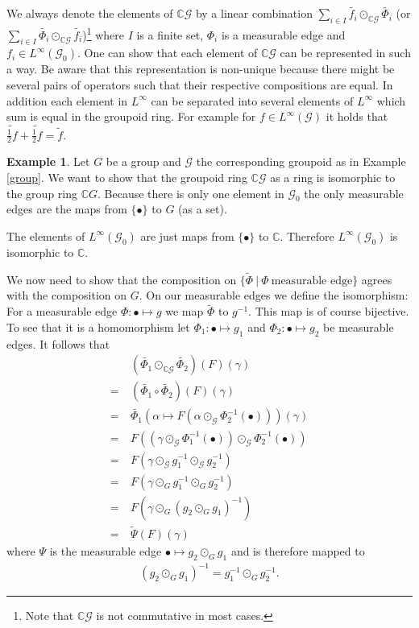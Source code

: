 \documentclass[12pt,a4paper]{scrartcl}
\theoremstyle{plain}
\theoremstyle{definition}
\newtheorem{Example}[Theorem]{Example}
\newcommand{\C}{\mathbb{C}} %
\newcommand{\2}{\mathbb{Z} / 2 \mathbb{Z}}
\newcommand{\G}{\mathcal{G}}
\newcommand{\1}{\bar{1}}
\newcommand{\0}{\bar{0}}
\begin{document}
We always denote the elements of $\C\G$ by a linear combination $\sum_{i \in I} \widetilde{f_i} \odot_{\C \G} \widetilde{\Phi_i}$ (or $\sum_{i \in I} \widetilde{\Phi_i} \odot_{\C \G} \widetilde{f_i}$)\footnote{Note that $\C\G$ is not commutative in most cases.} where $I$ is a finite set, $\Phi_i$ is a measurable edge and $f_i \in L^\infty(\G_0)$. One can show that each element of $\C \G$ can be represented in such a way. Be aware that this representation is non-unique because there might be several pairs of operators such that their respective compositions are equal. In addition each element in $L^\infty$ can be separated into several elements of $L^\infty$ which sum is equal in the groupoid ring. For example for $f \in L^\infty(\G)$ it holds that $\widetilde{\frac{1}{2}f} + \widetilde{\frac{1}{2}f} = \tilde{f}$.
\begin{Example} \label{groupoid_ring_of_groups}
	Let $G$ be a group and $\G$ the corresponding groupoid as in Example \ref{group}. We want to show that the groupoid ring $\C \G$ as a ring is isomorphic to the group ring $\C G$. Because there is only one element in $\G_0$ the only measurable edges are the maps from $\{\bullet\}$ to $G$ (as a set). 
	
	The elements of $L^\infty(\G_0)$ are just maps from $\{\bullet \}$ to $\C$. Therefore  $L^\infty(\G_0)$ is isomorphic to $\C$. 
	
	We now need to show that the composition on $\{\tilde{\Phi}~|~ \Phi~\text{measurable edge}\}$ agrees with the composition on $G$.
	On our measurable edges we define the isomorphism: For a measurable edge $\Phi\colon\bullet \mapsto g$ we map $\tilde{\Phi}$ to $g^{-1}$. This map is of course bijective. To see that it is a homomorphism let $\Phi_1\colon\bullet \mapsto g_1$ and $\Phi_2\colon\bullet \mapsto g_2$ be measurable edges. It follows that
	\begin{align*}
		  &~ (\widetilde{\Phi_1} \odot_{\C \G} \widetilde{\Phi_2})(F)(\gamma) \\
		= &~ (\widetilde{\Phi_1} \circ \widetilde{\Phi_2})(F)(\gamma) \\
		= &~ \widetilde{\Phi_1} (\alpha \mapsto F(\alpha \odot_{\G}\Phi_2^{-1}(\bullet)))(\gamma) \\
		= &~ F((\gamma \odot_{\G} \Phi_1^{-1}(\bullet)) \odot_{\G} \Phi_2^{-1}(\bullet)) \\
		= &~ F(\gamma \odot_\G g_1^{-1} \odot_\G g_2^{-1}) \\
		= &~ F(\gamma \odot_G g_1^{-1} \odot_G g_2^{-1}) \\
		= &~ F(\gamma \odot_G (g_2 \odot_G g_1)^{-1}) \\
		= &~ \tilde{\Psi} (F)(\gamma)
	\end{align*}
	where $\Psi$ is the measurable edge $\bullet \mapsto g_2 \odot_G g_1$ and is therefore mapped to 
	\begin{align*}
		(g_2 \odot_G g_1)^{-1} = g_1^{-1} \odot_G g_2^{-1}.
	\end{align*}
\end{Example}
\end{document}
